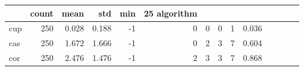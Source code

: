 \begin{tabular}{lrrrrrrrrr}
\toprule
 & count & mean & std & min & 25%
algorithm &  &  &  &  &  &  &  &  &  \\
\midrule
cup & 250 & 0.028 & 0.188 & -1 & 0 & 0 & 0 & 1 & 0.036 \\
cas & 250 & 1.672 & 1.666 & -1 & 0 & 2 & 3 & 7 & 0.604 \\
cor & 250 & 2.476 & 1.476 & -1 & 2 & 3 & 3 & 7 & 0.868 \\
\bottomrule
\end{tabular}
